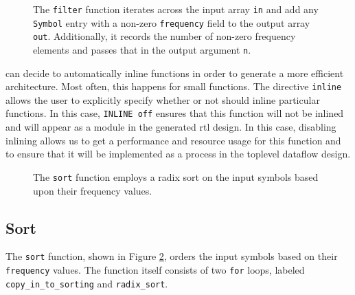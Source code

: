 \begin{figure}

\caption{  The \lstinline{filter} function iterates across the input array \lstinline{in} and add any \lstinline{Symbol} entry with a non-zero \lstinline{frequency} field to the output array \lstinline{out}. Additionally, it records the number of non-zero frequency elements and passes that in the output argument \lstinline{n}.  }
\label{fig:huffman_filter.cpp}
\end{figure}

\begin{aside}
\VHLS can decide to automatically inline functions in order to generate a more efficient architecture. Most often, this happens for small functions.  The directive \lstinline{inline} allows the user to explicitly specify whether or not \VHLS should inline particular functions. In this case, \lstinline{INLINE off} ensures that this function will not be inlined and will appear as a module in the generated \gls{rtl} design. In this case, disabling inlining allows us to get a performance and resource usage for this function and to ensure that it will be implemented as a process in the toplevel dataflow design.
\end{aside}

%

\begin{figure}

\end{figure}
\begin{figure}

\caption{  The \lstinline{sort} function employs a radix sort on the input symbols based upon their frequency values. }
\label{fig:huffman_sort.cpp}
\end{figure}

\subsection{Sort}

The \lstinline{sort} function, shown in Figure \ref{fig:huffman_sort.cpp}, orders the input symbols based on their \lstinline{frequency} values. The function itself consists of two \lstinline{for} loops, labeled \lstinline{copy_in_to_sorting} and \lstinline{radix_sort}. 

